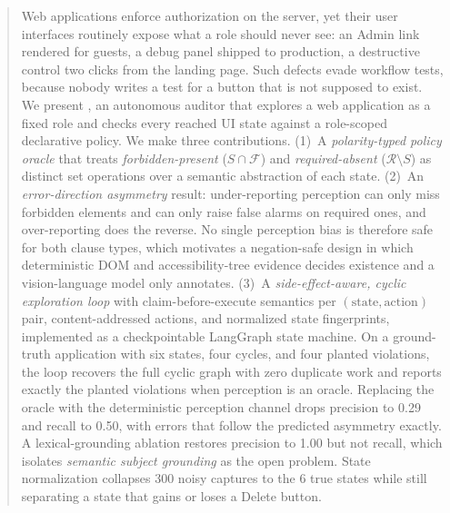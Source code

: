 \begin{abstract}
Web applications enforce authorization on the server, yet their user
interfaces routinely expose what a role should never see: an Admin link
rendered for guests, a debug panel shipped to production, a destructive
control two clicks from the landing page. Such defects evade workflow tests,
because nobody writes a test for a button that is not supposed to exist. We
present \sys{}, an autonomous auditor that explores a web application as a
fixed role and checks every reached UI state against a role-scoped declarative
policy. We make three contributions. (1)~A \emph{polarity-typed policy oracle}
that treats \emph{forbidden-present} ($S\cap\mathcal F$) and
\emph{required-absent} ($\mathcal R\setminus S$) as distinct set operations over
a semantic abstraction of each state. (2)~An \emph{error-direction asymmetry}
result: under-reporting perception can only miss forbidden elements and can
only raise false alarms on required ones, and over-reporting does the reverse.
No single perception bias is therefore safe for both clause types, which
motivates a negation-safe design in which deterministic DOM and
accessibility-tree evidence decides existence and a vision-language model only
annotates. (3)~A \emph{side-effect-aware, cyclic exploration loop} with
claim-before-execute semantics per $(\text{state},\text{action})$ pair,
content-addressed actions, and normalized state fingerprints, implemented as a
checkpointable LangGraph state machine. On a ground-truth application with six
states, four cycles, and four planted violations, the loop recovers the full
cyclic graph with zero duplicate work and reports exactly the planted
violations when perception is an oracle. Replacing the oracle with the
deterministic perception channel drops precision to 0.29 and recall to 0.50,
with errors that follow the predicted asymmetry exactly. A lexical-grounding
ablation restores precision to 1.00 but not recall, which isolates
\emph{semantic subject grounding} as the open problem. State normalization
collapses 300 noisy captures to the 6 true states while still separating a
state that gains or loses a Delete button.
\end{abstract}
